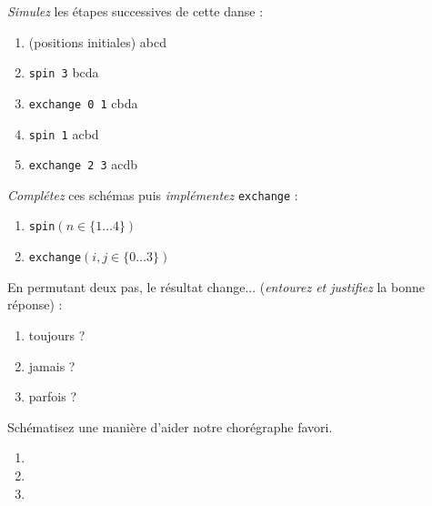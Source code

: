 \begin{exo}\label{ex:sim}
\emph{Simulez} les étapes successives de cette danse :
	\begin{enumerate}%
	\item (positions initiales) \hfill \boxes abcd
	\item \texttt{spin 3} \hfill \boxes bcda
	\item \texttt{exchange 0 1} \hfill \boxes cbda
	\item \texttt{spin 1} \hfill \boxes acbd
	\item \texttt{exchange 2 3} \hfill \boxes acdb
	\end{enumerate}
\end{exo}

\begin{exo}
\emph{Complétez} ces schémas puis \emph{implémentez} \texttt{exchange} :
\begin{multicols}{2}
	\begin{enumerate}[label=]
	\item \emptyboxes \texttt{spin$(n\in\{1\dots4\})$}
	\item \emptyboxes \texttt{exchange$(i, j\in\{0\dots3\})$}
	\end{enumerate}
\end{multicols}
\end{exo}

\begin{exo}
En permutant deux pas, le résultat change...
	(\emph{entourez et justifiez} la bonne réponse) :
	\begin{enumerate}
		\item toujours ?
		\item jamais ?
		\item parfois ? 
	\end{enumerate}
\end{exo}

\begin{exo}
Schématisez une manière d'aider notre chorégraphe favori.
\begin{enumerate}
\item {}
\item {}
\item {}
\end{enumerate}
\end{exo}

